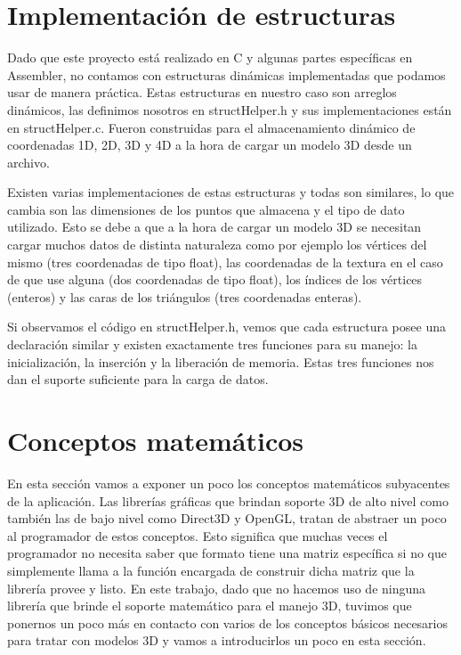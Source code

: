 \documentclass[a4paper]{article}
\begin{document}
\section{Implementación de estructuras}
Dado que este proyecto está realizado en C y algunas partes específicas en Assembler, no contamos con estructuras dinámicas implementadas que podamos usar de manera práctica. Estas estructuras en nuestro caso son arreglos dinámicos, las definimos nosotros en structHelper.h y sus implementaciones están en structHelper.c. Fueron construidas para el almacenamiento dinámico de coordenadas 1D, 2D, 3D y 4D a la hora de cargar un modelo 3D desde un archivo.
\par Existen varias implementaciones de estas estructuras y todas son similares, lo que cambia son las dimensiones de los puntos que almacena y el tipo de dato utilizado. Esto se debe a que a la hora de cargar un modelo 3D se necesitan cargar muchos datos de distinta naturaleza como por ejemplo los vértices del mismo (tres coordenadas de tipo float), las coordenadas de la textura en el caso de que use alguna (dos coordenadas de tipo float), los índices de los vértices (enteros) y las caras de los triángulos (tres coordenadas enteras).
\par Si observamos el código en structHelper.h, vemos que cada estructura posee una declaración similar y existen exactamente tres funciones para su manejo: la inicialización, la inserción y la liberación de memoria. Estas tres funciones nos dan el suporte suficiente para la carga de datos.
 
\section{Conceptos matemáticos}

En esta sección vamos a exponer un poco los conceptos matemáticos subyacentes de la aplicación. Las librerías gráficas que brindan soporte 3D de alto nivel como también las de bajo nivel como Direct3D y OpenGL, tratan de abstraer un poco al programador de estos conceptos. Esto significa que muchas veces el programador no necesita saber que formato tiene una matriz específica si no que simplemente llama a la función encargada de construir dicha matriz que la librería provee y listo. En este trabajo, dado que no hacemos uso de ninguna librería que brinde el soporte matemático para el manejo 3D, tuvimos que ponernos un poco más en contacto con varios de los conceptos básicos necesarios para tratar con modelos 3D y vamos a introducirlos un poco en esta sección.
\end{document}
